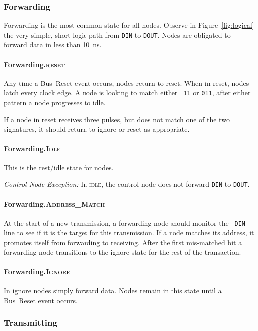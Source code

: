 \subsubsection{Forwarding}
Forwarding is the most common state for all \bus nodes.  Observe in
Figure~\ref{fig:logical} the very simple, short logic path from {\tt DIN} to
{\tt DOUT}. Nodes are obligated to forward data in less than 10~ns.

\paragraph{Forwarding.\textsc{reset}}
Any time a Bus~Reset event occurs, nodes return to {\sc reset}. When in {\sc
reset}, nodes latch every clock edge. A node is looking to match either {\tt
11} or {\tt 011}, after either pattern a node progresses to {\sc idle}.

If a node in {\sc reset} receives three pulses, but does not match one of the
two signatures, it should return to {\sc ignore} or {\sc reset} as
appropriate.

\paragraph{Forwarding.\textsc{Idle}}
This is the rest/idle state for \bus nodes.

\medskip
\noindent
{\em Control Node Exception:} In \textsc{idle}, the control node does not
forward {\tt DIN} to {\tt DOUT}.

\paragraph{Forwarding.\textsc{Address\_Match}}
At the start of a new transmission, a forwarding node should monitor the {\tt
DIN} line to see if it is the target for this transmission. If a node matches
its address, it promotes itself from forwarding to receiving. After the first
mis-matched bit a forwarding node transitions to the {\sc ignore} state for
the rest of the transaction.

\paragraph{Forwarding.\textsc{Ignore}}
In {\sc ignore} nodes simply forward data. Nodes remain in this state until a
Bus~Reset event occurs.

\subsubsection{Transmitting}

